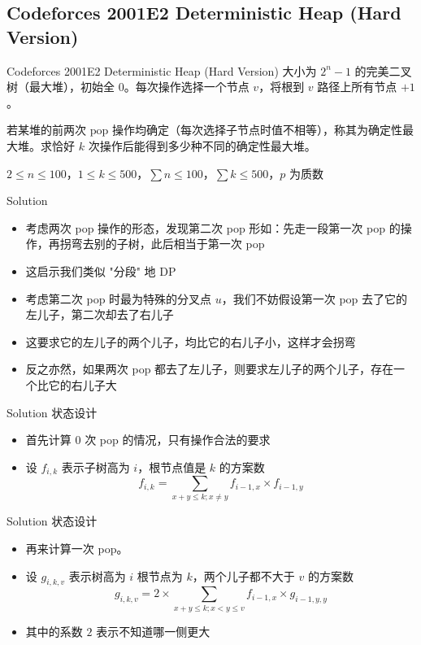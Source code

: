 ﻿\documentclass[aspectratio=169]{ctexbeamer}
\begin{document}
\subsection{Codeforces 2001E2 Deterministic Heap (Hard Version)}

\begin{frame}{Codeforces 2001E2 Deterministic Heap (Hard Version)}
      大小为 $2^n-1$ 的完美二叉树（最大堆），初始全 $0$。每次操作选择一个节点 $v$，将根到 $v$ 路径上所有节点 $+1$。
      
      若某堆的前两次 $\mathrm{pop}$ 操作均确定（每次选择子节点时值不相等），称其为确定性最大堆。求恰好 $k$ 次操作后能得到多少种不同的确定性最大堆。
      
      $2\le n\le 100$，$1\le k\le 500$，$\sum n\le 100$，$\sum k\le 500$，$p$ 为质数
\end{frame}

\begin{frame}{Solution}
    \begin{itemize}
        \item 考虑两次 pop 操作的形态，发现第二次 pop 形如：先走一段第一次 pop 的操作，再拐弯去别的子树，此后相当于第一次 pop
        \item 这启示我们类似 "分段" 地 DP
        \item 考虑第二次 pop 时最为特殊的分叉点 $u$，我们不妨假设第一次 pop 去了它的左儿子，第二次却去了右儿子
        \item 这要求它的左儿子的两个儿子，均比它的右儿子小，这样才会拐弯
        \item 反之亦然，如果两次 pop 都去了左儿子，则要求左儿子的两个儿子，存在一个比它的右儿子大
    \end{itemize}
\end{frame}

\begin{frame}{Solution}
    状态设计
    \begin{itemize}
        \item 首先计算 $ 0 $ 次 pop 的情况，只有操作合法的要求
        \item 设 $f_{i,k}$ 表示子树高为 $i$，根节点值是 $k$ 的方案数
        $$
            f_{i,k}=\sum_{x+y\le k;x\neq y}f_{i-1,x}\times f_{i-1,y}
        $$
    \end{itemize}
\end{frame}

\begin{frame}{Solution}
    状态设计
    \begin{itemize}
        \item 再来计算一次 pop。
        \item 设 $g_{i,k,v}$ 表示树高为 $i$ 根节点为 $k$，两个儿子都不大于 $v$ 的方案数
        $$
            g_{i,k,v}=2\times \sum_{x+y\le k;x<y\le v}f_{i-1,x}\times g_{i-1,y,y}
        $$
        \item 其中的系数 $2$ 表示不知道哪一侧更大
    \end{itemize}
\end{frame}
\end{document}
